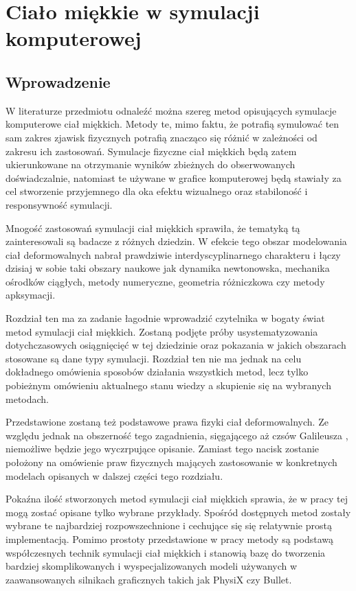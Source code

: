 \chapter{Ciało miękkie w symulacji komputerowej}

\section{Wprowadzenie}

W literaturze przedmiotu odnaleźć można szereg metod opisujących symulacje komputerowe ciał
miękkich. Metody te, mimo faktu, że potrafią symulować ten sam zakres zjawisk
fizycznych potrafią znacząco się różnić w zależności od zakresu ich zastosowań.
Symulacje fizyczne ciał miękkich będą zatem ukierunkowane na otrzymanie wyników
zbieżnych do obserwowanych doświadczalnie, natomiast te używane w grafice
komputerowej będą stawiały za cel stworzenie przyjemnego dla oka efektu
wizualnego oraz stabiloność i responsywność symulacji.

Mnogość zastosowań symulacji ciał miękkich sprawiła, że tematyką tą
zainteresowali są badacze z różnych dziedzin. W efekcie tego obszar modelowania ciał
deformowalnych nabrał prawdziwie interdyscyplinarnego charakteru i łączy dzisiaj w sobie
taki obszary naukowe jak dynamika newtonowska, mechanika ośrodków ciągłych,
metody numeryczne, geometria różniczkowa czy metody apksymacji\cite{pbdo}.

Rozdział ten ma za zadanie łagodnie wprowadzić czytelnika w bogaty świat metod symulacji
ciał miękkich. Zostaną podjęte próby usystematyzowania dotychczasowych
osiągnięcięć w tej dziedzinie oraz pokazania w jakich obszarach stosowane są
dane typy symulacji. Rozdział ten nie ma jednak na celu dokładnego omówienia sposobów 
działania wszystkich metod, lecz tylko pobieżnym omówieniu aktualnego stanu
wiedzy a skupienie się na wybranych metodach.

Przedstawione zostaną też podstawowe prawa fizyki ciał deformowalnych. Ze
względu jednak na obszerność tego zagadnienia, sięgającego aż czsów Galileusza
\cite{elast}, niemożliwe będzie jego wyczrpujące opisanie. Zamiast tego nacisk
zostanie położony na omówienie praw fizycznych mających zastosowanie w
konkretnych modelach opisanych w dalszej części tego rozdziału.

Pokaźna ilość stworzonych metod symulacji ciał miękkich sprawia, że w pracy tej mogą zostać
opisane tylko wybrane przykłady. Spośród dostępnych metod zostały wybrane 
te najbardziej rozpowszechnione i cechujące się się
relatywnie prostą implementacją. Pomimo prostoty przedstawione w pracy
metody są podstawą współczesnych technik symulacji ciał
miękkich i stanowią bazę do tworzenia bardziej skomplikowanych i 
wyspecjalizowanych modeli używanych w zaawansowanych silnikach graficznych
takich jak PhysiX czy Bullet.

